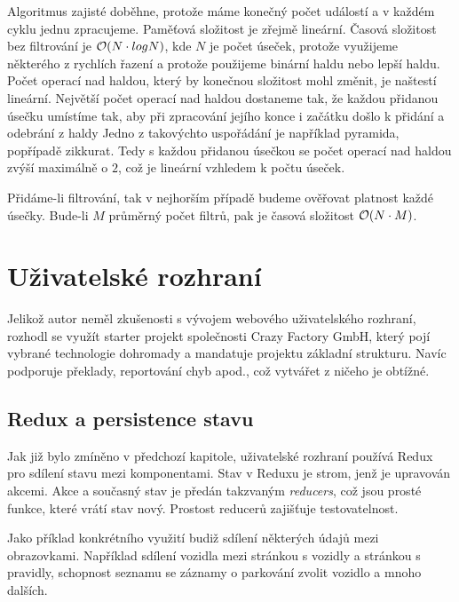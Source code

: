 \noindent
Algoritmus zajisté doběhne, protože máme konečný počet událostí a v každém cyklu jednu zpracujeme.
Paměťová složitost je zřejmě lineární. Časová složitost bez filtrování je ${\cal O}(N\cdot{logN})$, kde $N$ je 
počet úseček, protože
využijeme některého z rychlích řazení a protože použijeme binární haldu nebo lepší haldu. Počet operací nad haldou,
který by konečnou složitost mohl změnit, je naštestí lineární. Největší počet operací nad haldou dostaneme tak, že
každou přidanou úsečku umístíme tak, aby při zpracování jejího konce i začátku došlo k přidání a odebrání z haldy
Jedno z takovýchto uspořádání je například pyramida, popřípadě zikkurat.
Tedy s každou přidanou úsečkou se počet operací nad haldou zvýší maximálně o $2$, což je lineární vzhledem k počtu úseček.

Přidáme-li filtrování, tak v nejhorším případě budeme ověřovat platnost každé úsečky. Bude-li $M$ průměrný počet
filtrů, pak je časová složitost ${\cal O}(N\cdot{M})$. 

\section{Uživatelské rozhraní}

\noindent
Jelikož autor neměl zkušenosti s vývojem webového uživatelského rozhraní, rozhodl se využít starter projekt
společnosti Crazy Factory GmbH, který pojí vybrané technologie dohromady a mandatuje projektu základní strukturu.
Navíc podporuje překlady, reportování chyb apod., což vytvářet z ničeho je obtížné. \citep[viz][]{CFProj}

\subsection{Redux a persistence stavu}

\noindent
Jak již bylo zmíněno v předchozí kapitole, uživatelské rozhraní používá Redux pro sdílení stavu mezi komponentami.
Stav v Reduxu je strom, jenž je upravován akcemi. Akce a současný stav je předán takzvaným \textit{reducers}, což jsou prosté funkce,
které vrátí stav nový. \citep[viz][]{ReduxCore} Prostost reducerů zajišťuje testovatelnost.

Jako příklad konkrétního využití budiž sdílení některých údajů mezi obrazovkami.
Například sdílení vozidla mezi stránkou s vozidly a stránkou s pravidly, schopnost seznamu se záznamy o parkování
zvolit vozidlo a mnoho dalších.

